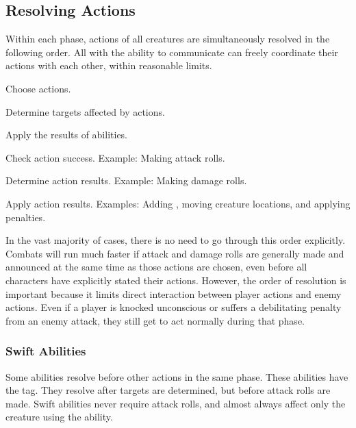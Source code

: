     \subsection{Resolving Actions}\label{Resolving Actions}

        Within each phase, actions of all creatures are simultaneously resolved in the following order.
        All  with the ability to communicate can freely coordinate their actions with each other, within reasonable limits.

        \begin{enumerate*}
            \item Choose actions.
            \item Determine targets affected by actions.
            \item Apply the results of  abilities.
            \item Check action success.
                Example: Making attack rolls.
            \item Determine action results.
                Example: Making damage rolls.
            \item Apply action results.
                Examples: Adding , moving creature locations, and applying penalties.
        \end{enumerate*}

        In the vast majority of cases, there is no need to go through this order explicitly.
        Combats will run much faster if attack and damage rolls are generally made and announced at the same time as those actions are chosen, even before all characters have explicitly stated their actions.
        However, the order of resolution is important because it limits direct interaction between player actions and enemy actions.
        Even if a player is knocked unconscious or suffers a debilitating penalty from an enemy attack, they still get to act normally during that phase.

        \subsubsection{Swift Abilities}\label{Swift Abilities}
            Some abilities resolve before other actions in the same phase.
            These abilities have the  tag.
            They resolve after targets are determined, but before attack rolls are made.
            Swift abilities never require attack rolls, and almost always affect only the creature using the ability.

